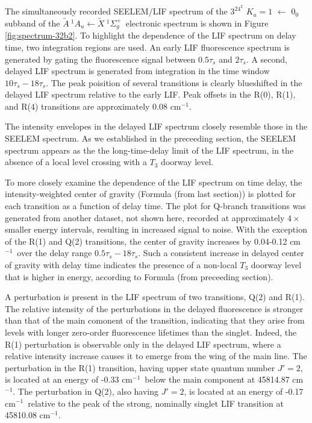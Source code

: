 \documentclass[12pt]{mitthesis}
\newcommand{\rcm}{cm$^{-1}$}
\newcommand{\AtoX}{$
  \tilde{A} \: ^1\!A_u 
  \leftarrow 
  \tilde{X} \: ^1\Sigma_g^+
  $}
\newcommand{\Ka}[1]{$K_a\!\!=\!#1$}
\begin{document}
The simultaneously recorded SEELEM/LIF spectrum of the $3^24^2$ \Ka{1}
$\leftarrow$ $0_0$ subband of the \AtoX\ electronic spectrum is shown
in Figure \ref{fig:spectrum-32b2}. To highlight the dependence of the LIF
spectrum on delay time, two integration regions are used.  An early
LIF fluorescence spectrum is generated by gating the fluorescence signal between $0.5\tau_s$ and $2\tau_s$.
A second, delayed LIF spectrum is generated from integration in the time window $10\tau_s-18\tau_s$.  The peak poisition of several transitions is
clearly blueshifted in the delayed LIF spectrum relative to the early
LIF.  Peak offsets in the R(0), R(1), and R(4) transitions are
approximately 0.08 \rcm.

The intensity envelopes in the delayed LIF spectrum closely resemble
those in the SEELEM spectrum.  As we established in the preceeding
section, the SEELEM spectrum appears as the the long-time-delay limit
of the LIF spectrum, in the absence of a local level crossing with a
$T_3$ doorway level.

To more closely examine the dependence of the LIF spectrum on time
delay, the intensity-weighted center of gravity (Formula (from
last section)) is plotted for each transition as a function of delay time.  The
plot for Q-branch transitions was generated from another dataset, not
shown here, recorded at approximately $4 \times$ smaller energy
intervals, resulting in increased signal to noise.  With the exception
of the R(1) and Q(2) transitions, the center of gravity increases by
0.04-0.12 \rcm\ over the delay range $0.5\tau_s-18\tau_s$.  Such a
consistent increase in delayed center of gravity with delay time
indicates the presence of a non-local $T_3$ doorway level that is
higher in energy, according to Formula (from preceeding section).


A perturbation is present in the LIF spectrum of two transitions, Q(2)
and R(1).  The relative intensity of the perturbations in the delayed
fluorescence is stronger than that of the main comonent of the
transition, indicating that they arise from levels with longer
zero-order fluorescence lifetimes than the singlet.  Indeed, the R(1)
perturbation is observable only in the delayed LIF spectrum, where a
relative intensity increase causes it to emerge from the wing of the
main line.  The perturbation in the R(1) transition, having upper
state quantum number $J'=2$, is located at an energy of -0.33 \rcm\
below the main component at 45814.87 \rcm.  The perturbation in Q(2),
also having $J'=2$, is located at an energy of -0.17 \rcm\ relative to
the peak of the strong, nominally singlet LIF transition at 45810.08
\rcm.  
\end{document}
